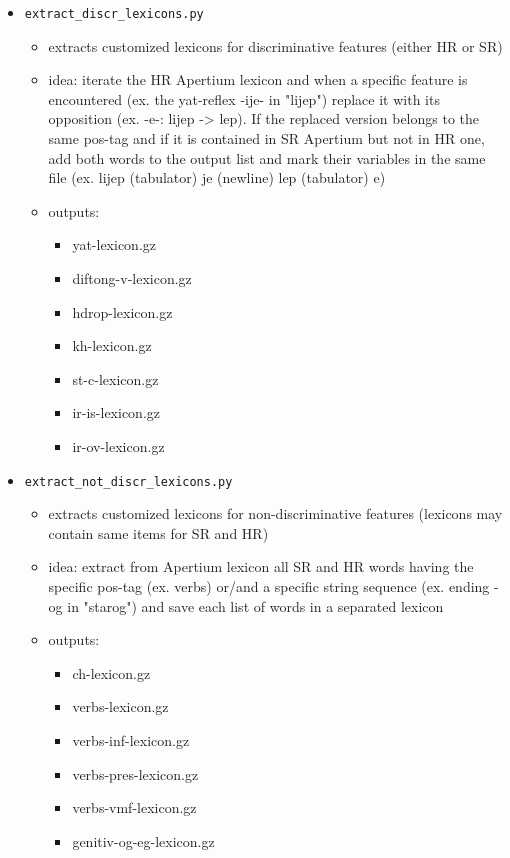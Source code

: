 \documentclass[a4paper]{article}
\begin{document}
\begin{itemize}
\item \texttt{extract\_discr\_lexicons.py}
\begin{itemize}
\item extracts customized lexicons for discriminative features (either HR or SR)
\item idea: iterate the HR Apertium lexicon and when a specific feature is encountered (ex. the yat-reflex -ije- in "lijep") replace it with its opposition (ex. -e-: lijep -> lep). If the replaced version belongs to the same pos-tag and if it is contained in SR Apertium but not in HR one, add both words to the output list and mark their variables in the same file (ex. lijep (tabulator) je (newline) lep (tabulator) e)
\item outputs:
\begin{itemize}
\item yat-lexicon.gz
\item diftong-v-lexicon.gz
\item hdrop-lexicon.gz
\item kh-lexicon.gz
\item st-c-lexicon.gz
\item ir-is-lexicon.gz
\item ir-ov-lexicon.gz

\end{itemize}
\end{itemize}

\item \texttt{extract\_not\_discr\_lexicons.py}
\begin{itemize}
\item extracts customized lexicons for non-discriminative features (lexicons may contain same items for SR and HR)
\item idea: extract from Apertium lexicon all SR and HR words having the specific pos-tag (ex. verbs) or/and a specific string sequence (ex. ending -og in "starog") and save each list of words in a separated lexicon
\item outputs:
\begin{itemize}
\item ch-lexicon.gz
\item verbs-lexicon.gz
\item verbs-inf-lexicon.gz
\item verbs-pres-lexicon.gz
\item verbs-vmf-lexicon.gz
\item genitiv-og-eg-lexicon.gz

\end{itemize}
\end{itemize}
\end{itemize}
\end{document}
